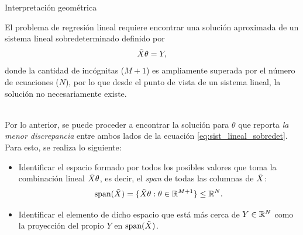 \documentclass[handout, 9pt]{beamer}
\begin{document}
\begin{frame}{Interpretación geométrica}

El problema de regresión lineal requiere encontrar una solución aproximada de un sistema lineal sobredeterminado definido por 
\begin{equation*}
	\tilde{X} \theta = Y\label{eq:sist_lineal_sobredet},
\end{equation*}
donde la cantidad de incógnitas ($M+1$) es ampliamente superada por el número de ecuaciones ($N$), por lo que desde el punto de vista de un sistema lineal, la solución no necesariamente existe.\\~\ \pause

Por lo anterior, se puede proceder a encontrar la solución para $\theta$ que reporta \emph{la menor discrepancia} entre ambos lados de la ecuación \eqref{eq:sist_lineal_sobredet}. Para esto, se realiza lo siguiente:\pause

\begin{itemize}
	\item Identificar el espacio formado por todos los posibles valores que toma la combinación lineal $\tilde{X} \theta$, es decir, el \emph{span} de todas las columnas de $\tilde{X}$:
	\begin{equation*}
		\text{span}(\tilde{X}) = \{\tilde{X}\theta:\theta\in\mathbb{R}^{M+1}\}\leq \mathbb{R}^N.
	\end{equation*}\pause
	\item Identificar el elemento de dicho espacio que está más cerca de $Y\in\mathbb{R}^N$  como la proyección del propio $Y$ en $\text{span}(\tilde{X})$.
\end{itemize}

\end{frame}
\end{document}
